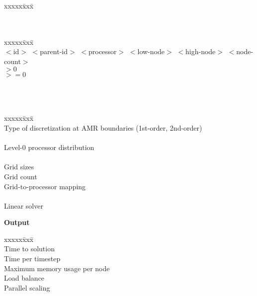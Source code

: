 \documentclass[11pt]{article}
\begin{document}
\begin{tabbing}
xxxxx\=xxx\=\kill\\ 
\> \done {} \\
\>\>  \\
\>\> 
\end{tabbing}

\begin{tabbing}
xxxxx\=xxx\=\kill\\ 
\>  $<$id$>$ $<$parent-id$>$ $<$processor$>$ $<$low-node$>$ $<$high-node$>$ $<$node-count$>$ \\
\> \>  $> 0$ \\
\> \>  $>= 0$  \\
\> \>  \\
\> \> \code{[3]} \\
\> \> \code{[3]} \\
\> \> \code{[3]}
\end{tabbing}

\begin{tabbing}
xxxxx\=xxx\=\kill\\ 
\> \todo \>   Type of discretization at AMR boundaries (1st-order, 2nd-order) \\
 \\
\> \todo \>    Level-0 processor distribution \\
 \\
\> \todo \>    Grid sizes \\
\> \todo \>    Grid count \\
\> \todo \>    Grid-to-processor mapping \\
 \\
\> \todo \>    Linear solver \\
\end{tabbing}

\textbf{Output}

\begin{tabbing}
xxxxx\=xxx\=\kill\\ 
\> \todo \>    Time to solution \\
\> \todo \>    Time per timestep \\
\> \todo \>    Maximum memory usage per node \\
\> \todo \>    Load balance \\
\> \todo \>    Parallel scaling \\
\end{tabbing}
\end{document}

